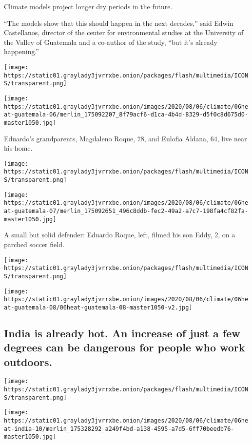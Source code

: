 Climate models project longer dry periods in the future.

``The models show that this should happen in the next decades,'' said
Edwin Castellanos, director of the center for environmental studies at
the University of the Valley of Guatemala and a co-author of the study,
``but it's already happening.''

\texttt{[image: https://static01.graylady3jvrrxbe.onion/packages/flash/multimedia/ICONS/transparent.png]}

\texttt{[image: https://static01.graylady3jvrrxbe.onion/images/2020/08/06/climate/06heat-guatemala-06/merlin\_175092207\_8f79acf6-d1ca-4b4d-8329-d5f0c8d675d0-master1050.jpg]}

Eduardo's grandparents, Magdaleno Roque, 78, and Eulofia Aldana, 64,
live near his home.

\texttt{[image: https://static01.graylady3jvrrxbe.onion/packages/flash/multimedia/ICONS/transparent.png]}

\texttt{[image: https://static01.graylady3jvrrxbe.onion/images/2020/08/06/climate/06heat-guatemala-07/merlin\_175092651\_496c8ddb-fec2-49a2-a7c7-198fa4cf82fa-master1050.jpg]}

A small but solid defender: Eduardo Roque, left, filmed his son Eddy, 2,
on a parched soccer field.

\texttt{[image: https://static01.graylady3jvrrxbe.onion/packages/flash/multimedia/ICONS/transparent.png]}

\texttt{[image: https://static01.graylady3jvrrxbe.onion/images/2020/08/06/climate/06heat-guatemala-08/06heat-guatemala-08-master1050-v2.jpg]}

\hypertarget{india-is-already-hot-an-increase-of-just-a-few-degrees-can-be-dangerous-for-people-who-work-outdoors}{%
\subsection{India is already hot. An increase of just a few degrees can
be dangerous for people who work
outdoors.}\label{india-is-already-hot-an-increase-of-just-a-few-degrees-can-be-dangerous-for-people-who-work-outdoors}}

\texttt{[image: https://static01.graylady3jvrrxbe.onion/packages/flash/multimedia/ICONS/transparent.png]}

\texttt{[image: https://static01.graylady3jvrrxbe.onion/images/2020/08/06/climate/06heat-india-10/merlin\_175328292\_a249f4bd-a138-4595-a7d5-6ff70beedb76-master1050.jpg]}

